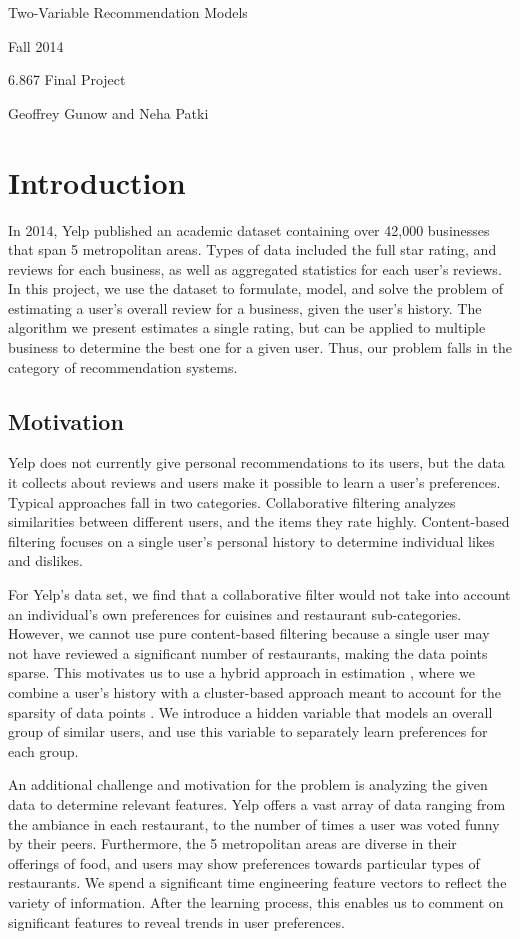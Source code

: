 \documentclass[11pt]{article}
\author{6.867 Homework 2 and 3}
\begin{document}
\noindent\centerline{\LARGE{Two-Variable Recommendation Models}}
\noindent\centerline{}
\noindent\centerline{}
\noindent\centerline{Fall 2014}
\noindent\centerline{6.867 Final Project}
\noindent\centerline{Geoffrey Gunow and Neha Patki}

\section{Introduction}
In 2014, Yelp published an academic dataset containing over 42,000 businesses that span 5 metropolitan areas. Types of data included the full star rating, and reviews for each business, as well as aggregated statistics for each user's reviews. In this project, we use the dataset to formulate, model, and solve the problem of estimating a user's overall review for a business, given the user's history. The algorithm we present estimates a single rating, but can be applied to multiple business to determine the best one for a given user. Thus, our problem falls in the category of recommendation systems.

\subsection{Motivation}
Yelp does not currently give personal recommendations to its users, but the data it collects about reviews and users make it possible to learn a user's preferences. Typical approaches fall in two categories. Collaborative filtering analyzes similarities between different users, and the items they rate highly. Content-based filtering focuses on a single user's personal history to determine individual likes and dislikes.

For Yelp's data set, we find that a collaborative filter would not take into account an individual's own preferences for cuisines and restaurant sub-categories. However, we cannot use pure content-based filtering because a single user may not have reviewed a significant number of restaurants, making the data points sparse. This motivates us to use a hybrid approach in estimation \cite{hybrid}, where we combine a user's history with a cluster-based approach meant to account for the sparsity of data points \cite{Guyon}. We introduce a hidden variable that models an overall group of similar users, and use this variable to separately learn preferences for each group.

An additional challenge and motivation for the problem is analyzing the given data to determine relevant features. Yelp offers a vast array of data ranging from the ambiance in each restaurant, to the number of times a user was voted funny by their peers. Furthermore, the 5 metropolitan areas are diverse in their offerings of food, and users may show preferences towards particular types of restaurants. We spend a significant time engineering feature vectors to reflect the variety of information. After the learning process, this enables us to comment on significant features to reveal trends in user preferences. 
\end{document}
